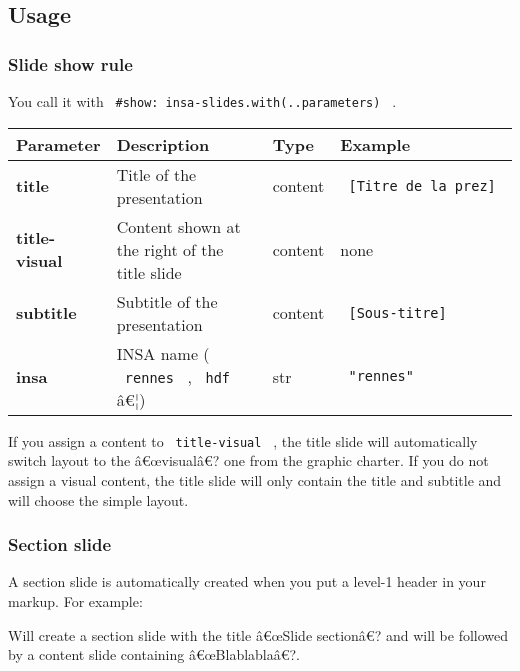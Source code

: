 \subsection{Usage}\label{usage}

\subsubsection{Slide show rule}\label{slide-show-rule}

You call it with \texttt{\ \#show:\ insa-slides.with(..parameters)\ } .

\begin{longtable}[]{@{}llll@{}}
\toprule\noalign{}
Parameter & Description & Type & Example \\
\midrule\noalign{}
\endhead
\bottomrule\noalign{}
\endlastfoot
\textbf{title} & Title of the presentation & content &
\texttt{\ {[}Titre\ de\ la\ prez{]}\ } \\
\textbf{title-visual} & Content shown at the right of the title slide &
content & none \\
\textbf{subtitle} & Subtitle of the presentation & content &
\texttt{\ {[}Sous-titre{]}\ } \\
\textbf{insa} & INSA name ( \texttt{\ rennes\ } , \texttt{\ hdf\ } â€¦)
& str & \texttt{\ "rennes"\ } \\
\end{longtable}

If you assign a content to \texttt{\ title-visual\ } , the title slide
will automatically switch layout to the â€œvisualâ€? one from the
graphic charter. If you do not assign a visual content, the title slide
will only contain the title and subtitle and will choose the simple
layout.

\subsubsection{Section slide}\label{section-slide}

A section slide is automatically created when you put a level-1 header
in your markup. For example:

\begin{Shaded}
\begin{Highlighting}[]
\end{Highlighting}
\end{Shaded}

Will create a section slide with the title â€œSlide sectionâ€? and will
be followed by a content slide containing â€œBlablablaâ€?.

